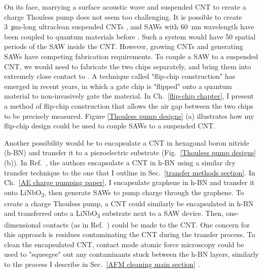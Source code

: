 \documentclass{beavtex_dub_edit}
\begin{document}
On its face, marrying a surface acoustic wave and suspended CNT to create a charge Thouless pump does not seem too challenging. It is possible to create \SI{3}{\micro\meter}-long ultraclean suspended CNTs \cite{senger_universal_2018}, and SAWs with \SI{60}{\nano\meter} wavelength have been coupled to quantum materials before \cite{kukushkin_collective_2011}. Such a system would have 50 spatial periods of the SAW inside the CNT. However, growing CNTs and generating SAWs have competing fabrication requirements. To couple a SAW to a suspended CNT, we would need to fabricate the two chips separately, and bring them into extremely close contact to . A technique called "flip-chip construction" has emerged in recent years, in which a gate chip is "flipped" onto a quantum material to non-invasively gate the material. In Ch.\ \ref{flip-chip chapter}, I present a method of flip-chip construction that allows the air gap between the two chips to be precisely measured. Figure \ref{Thouless pump designs} (a) illustrates how my flip-chip design could be used to couple SAWs to a suspended CNT.

Another possibility would be to encapsulate a CNT in hexagonal boron nitride (h-BN) and transfer it to a piezoelectric substrate (Fig.\ \ref{Thouless pump designs} (b)). In Ref.\ \cite{huang_superior_2015}, the authors encapsulate a CNT in h-BN using a similar dry transfer technique to the one that I outline in Sec.\ \ref{transfer methods section}. In Ch.\ \ref{AE charge pumping paper}, I encapsulate graphene in h-BN and transfer it onto LiNbO\textsubscript{3}, then generate SAWs to pump charge through the graphene. To create a charge Thouless pump, a CNT could similarly be encapsulated in h-BN and transferred onto a LiNbO\textsubscript{3} substrate next to a SAW device. Then, one-dimensional contacts (as in Ref.\ \cite{huang_superior_2015}) could be made to the CNT. One concern for this approach is residues contaminating the CNT during the transfer process. To clean the encapsulated CNT, contact mode atomic force microscopy could be used to "squeegee" out any contaminants stuck between the h-BN layers, similarly to the process I describe in Sec.\ \ref{AFM cleaning main section} \cite{goossens_mechanical_2012,chen_tip-based_2021}. 
\end{document}
